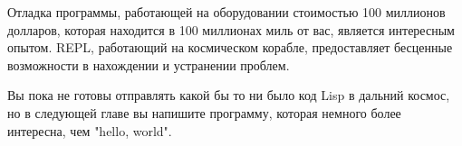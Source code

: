 Отладка программы, работающей на оборудовании стоимостью 100 миллионов долларов, которая
находится в 100 миллионах миль от вас, является интересным опытом. REPL, работающий на
космическом корабле, предоставляет бесценные возможности в нахождении и устранении
проблем.

Вы пока не готовы отправлять какой бы то ни было код Lisp в дальний космос, но в следующей
главе вы напишите программу, которая немного более интересна, чем "hello, world".

